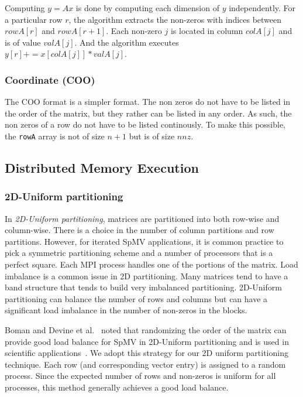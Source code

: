 \documentclass[sigconf,review,anonymous]{acmart}
\begin{document}
Computing $y = A x$ is done by computing each dimension of $y$
independently. For a particular row $r$, the algorithm extracts the
non-zeros with indices between $rowA[r]$ and $rowA[r+1]$. Each
non-zero $j$ is located in column $colA[j]$ and is of value
$valA[j]$. And the algorithm executes $y[r] += x[colA[j]]*valA[j]$.

\subsubsection{Coordinate (COO)}

The COO format is a simpler format. The non zeros do not have to be
listed in the order of the matrix, but they rather can be listed in
any order. As such, the non zeros of a row do not have to be listed
continously. To make this possible, the \texttt{rowA} array is not of
size $n+1$ but is of size $nnz$.



\subsection{Distributed Memory Execution}


\subsubsection{2D-Uniform partitioning}

In \textit{2D-Uniform partitioning},  matrices
are partitioned into both row-wise and column-wise.  There is a choice
in the number of column partitions and row partitions. However, for
iterated SpMV applications, it is common practice to pick a symmetric
partitioning scheme and a number of processors that is a perfect
square. Each MPI process handles one of the portions of the matrix.
Load imbalance is a common issue in 2D partitioning. Many matrices
tend to have a band structure that tends to build very imbalanced
partitioning.  2D-Uniform partitioning can balance the number of rows
and columns but can have a significant load imbalance in the number
of non-zeros in the blocks.

Boman and Devine et al.~\cite{boman2013scalable} noted that
randomizing the order of the matrix can provide good load balance for
SpMV in 2D-Uniform partitioning and is used in scientific
applications~\cite{dytrych2016efficacy}. We adopt this strategy for
our 2D uniform partitioning technique. Each row (and corresponding
vector entry) is assigned to a random process.  Since the expected
number of rows and non-zeros is uniform for all processes, this method
generally achieves a good load balance.
\end{document}
